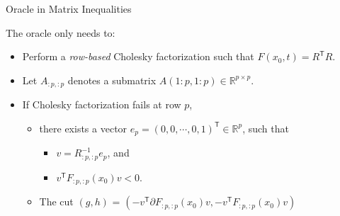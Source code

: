 \documentclass[10pt,ignorenonframetext,serif,onlymath]{beamer}
\providecommand{\tightlist}{%
  \setlength{\itemsep}{0pt}\setlength{\parskip}{0pt}}
\begin{document}
\begin{frame}{Oracle in Matrix Inequalities}
\protect\hypertarget{oracle-in-matrix-inequalities}{}

The oracle only needs to:

\begin{itemize}
\tightlist
\item
  Perform a \emph{row-based} Cholesky factorization such that
  \(F(x_0, t) = R^\mathsf{T} R\).
\item
  Let \(A_{:p,:p}\) denotes a submatrix
  \(A(1:p, 1:p) \in \mathbb{R}^{p\times p}\).
\item
  If Cholesky factorization fails at row \(p\),

  \begin{itemize}
  \tightlist
  \item
    there exists a vector
    \(e_p = (0, 0, \cdots, 0, 1)^\mathsf{T} \in \mathbb{R}^p\), such that

    \begin{itemize}
    \tightlist
    \item
      \(v = R_{:p,:p}^{-1} e_p\), and
    \item
      \(v^\mathsf{T} F_{:p,:p}(x_0) v < 0\).
    \end{itemize}
  \item
    The cut \((g, h)\) =
    \((-v^\mathsf{T} \partial F_{:p,:p}(x_0) v, -v^\mathsf{T} F_{:p,:p}(x_0) v)\)
  \end{itemize}
\end{itemize}

\end{frame}
\end{document}
